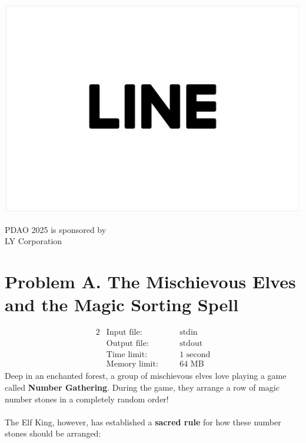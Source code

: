 \documentclass[12pt,a4paper]{article}
\begin{document}
\begin{center}
\begin{minipage}{0.35\textwidth}
    \includegraphics[width=\linewidth]{Line.png}
\end{minipage}
\begin{minipage}{0.35\textwidth}
    PDAO 2025 is sponsored by \\ \textcopyright \space LY Corporation
\end{minipage}
\end{center}


\newpage
\section*{\fontsize{18}{12}Problem A. The Mischievous Elves and the Magic Sorting Spell}

\begin{alignat*} {2}
 &   \text{Input file:}   \quad     &&\text{stdin}\\
 &   \text{Output file:}  \quad     &&\text{stdout}\\
 &   \text{Time limit:}   \quad     &&\text{1 second}\\
 &   \text{Memory limit:} \quad     &&\text{64 MB}
\end{alignat*}
\noindent
Deep in an enchanted forest, a group of mischievous elves love playing a game called \textbf{Number Gathering}. During the game, they arrange a row of magic number stones in a completely random order!
\\\\
\noindent
The Elf King, however, has established a \textbf{sacred rule} for how these number stones should be arranged:
\end{document}

